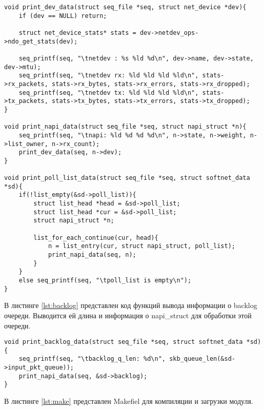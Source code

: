 \begin{center}
	\captionsetup{justification=raggedright,singlelinecheck=off}
	\begin{lstlisting}[label=lst:poll_list,caption=Функции вывода информации о списке poll\_list и структуре net\_device ,showstringspaces=false]
void print_dev_data(struct seq_file *seq, struct net_device *dev){
	if (dev == NULL) return;
	
	struct net_device_stats* stats = dev->netdev_ops->ndo_get_stats(dev);
	
	seq_printf(seq, "\tnetdev : %s %ld %d\n", dev->name, dev->state, dev->mtu);
	seq_printf(seq, "\tnetdev rx: %ld %ld %ld %ld\n", stats->rx_packets, stats->rx_bytes, stats->rx_errors, stats->rx_dropped);
	seq_printf(seq, "\tnetdev tx: %ld %ld %ld %ld\n", stats->tx_packets, stats->tx_bytes, stats->tx_errors, stats->tx_dropped);
}

void print_napi_data(struct seq_file *seq, struct napi_struct *n){
	seq_printf(seq, "\tnapi: %ld %d %d %d\n", n->state, n->weight, n->list_owner, n->rx_count);
	print_dev_data(seq, n->dev);
}

void print_poll_list_data(struct seq_file *seq, struct softnet_data *sd){
	if(!list_empty(&sd->poll_list)){
		struct list_head *head = &sd->poll_list;
		struct list_head *cur = &sd->poll_list;
		struct napi_struct *n;
		
		list_for_each_continue(cur, head){
			n = list_entry(cur, struct napi_struct, poll_list);
			print_napi_data(seq, n);
		}
	}
	else seq_printf(seq, "\tpoll_list is empty\n");
}
	\end{lstlisting}
\end{center}
\FloatBarrier

В листинге \ref{lst:backlog} представлен код функций вывода информации о backlog очереди. Выводится ей длина и информация о napi\_struct для обработки этой очереди.

\begin{center}
	\captionsetup{justification=raggedright,singlelinecheck=off}
	\begin{lstlisting}[label=lst:backlog,caption=Функция вывода информации о backlog очереди,showstringspaces=false]
void print_backlog_data(struct seq_file *seq, struct softnet_data *sd) {
	seq_printf(seq, "\tbacklog_q_len: %d\n", skb_queue_len(&sd->input_pkt_queue));
	print_napi_data(seq, &sd->backlog);
}
	\end{lstlisting}
\end{center}
\FloatBarrier

В листинге \ref{lst:make} представлен Makefiel для компиляции и загрузки модуля.

